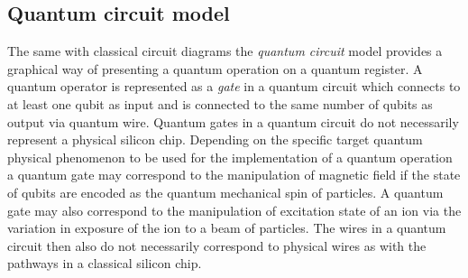 \subsection{Quantum circuit model}
The same with classical circuit diagrams the \textit{quantum circuit} model provides a graphical way of presenting a quantum operation on a quantum register. A quantum operator is represented as a \textit{gate} in a quantum circuit which connects to at least one qubit as input and is connected to the same number of qubits as output via quantum wire. Quantum gates in a quantum circuit do not necessarily represent a physical silicon chip. Depending on the specific target quantum physical phenomenon to be used for the implementation of a quantum operation a quantum gate may correspond to the manipulation of magnetic field if the state of qubits are encoded as the quantum mechanical spin of particles. A quantum gate may also correspond to the manipulation of excitation state of an ion via the variation in exposure of the ion to a beam of particles. The wires in a quantum circuit then also do not necessarily correspond to physical wires as with the pathways in a classical silicon chip.

